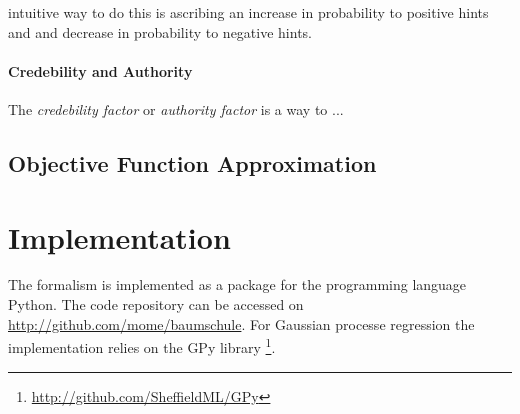 \documentclass[english]{article}
\begin{document}
intuitive way to do this is ascribing an increase in probability to positive hints and and decrease in probability to negative hints.

\paragraph{Credebility and Authority}
The \textit{credebility factor} or \textit{authority factor} is a way to ...

\subsection{Objective Function Approximation}


\section{Implementation}
The formalism is implemented as a package for the programming language Python. The code repository can be accessed on \url{http://github.com/mome/baumschule}. For Gaussian processe regression the implementation relies on the GPy library \footnote{\url{http://github.com/SheffieldML/GPy}}.
\end{document}
